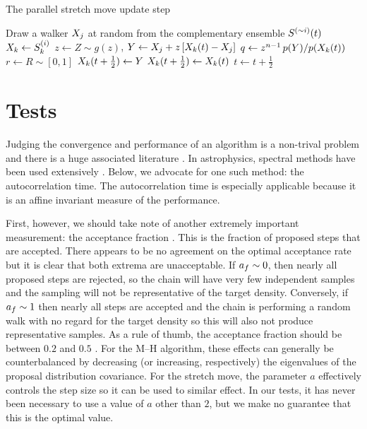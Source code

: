 \begin{algorithm}
\caption{The parallel stretch move update step
    }
\begin{algorithmic}[1]
     \label{line:parallelloop}
        \STATE Draw a walker $X_j$ at random from the complementary %
            ensemble $S^{(\sim i)} (t)$
        \STATE $X_k \gets S^{(i)}_k$
        \STATE $z \gets Z \sim g(z)$, 
        \STATE $Y \gets X_j
                + z \, [ X_k (t) - X_j]$
        \STATE $q \gets z^{n-1} \, p(Y)/p(X_k(t))$
        \STATE $r \gets R \sim [0, 1]$
            \STATE $X_k (t+\frac{1}{2}) \gets Y$
        \ELSE
            \STATE $X_k (t+\frac{1}{2}) \gets X_k(t)$
        \ENDIF
    \ENDFOR
    \STATE $t \gets t+\frac{1}{2}$
\ENDFOR

\end{algorithmic}
\end{algorithm}

\section{Tests} 

Judging the convergence and performance of an algorithm is a
non-trival problem and there is a huge associated literature
\citep[see, for example,][for a review]{Cowles:1996}. In astrophysics,
spectral methods have been used extensively \citep[for
example][]{Dunkley:2005}. Below, we advocate for one such method: the
autocorrelation time. The autocorrelation time is especially applicable
because it is an affine invariant measure of the performance.

First,
however, we should take note of another extremely important measurement:
the acceptance fraction \af. This is the fraction of proposed steps that are
accepted. There appears to be no agreement on the optimal acceptance rate
but it is clear that both extrema are unacceptable. If $a_f \sim 0$, then
nearly all proposed steps are rejected, so
the chain will have very few independent samples and the sampling will not be
representative of the target density. Conversely, if $a_f \sim 1$ then nearly
all steps are accepted and the
chain is performing a random walk with no regard for the target density so
this will also not produce representative samples. As a rule of thumb, the
acceptance fraction should be between $0.2$ and $0.5$
\citep[for example,][]{Gelman:1996}. For the M--H algorithm,
these effects can generally be counterbalanced by decreasing (or increasing,
respectively) the eigenvalues of the proposal distribution covariance. For
the stretch move, the parameter $a$ effectively controls the step size so
it can be used to similar effect. In our tests, it has never been
necessary to use a value of $a$ other than $2$, but we make no guarantee that
this is the optimal value.

